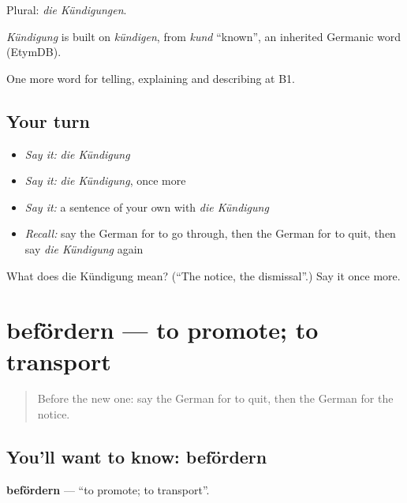 Plural: \emph{die Kündigungen}.

\begin{cousinweb}
\emph{Kündigung} is built on \emph{kündigen}, from \emph{kund} \textquotedblleft{}known\textquotedblright{}, an inherited Germanic word (EtymDB).
\end{cousinweb}

\begin{grammarlens}[title={What you've built}]
One more word for telling, explaining and describing at B1.
\end{grammarlens}

\subsection*{Your turn}
\begin{itemize}
\raggedright
  \item \emph{Say it:} \emph{die Kündigung}
  \item \emph{Say it:} \emph{die Kündigung}, once more
  \item \emph{Say it:} a sentence of your own with \emph{die Kündigung}
  \item \emph{Recall:} say the German for to go through, then the German for to quit, then say \emph{die Kündigung} again
\end{itemize}

\begin{tcolorbox}[breakable,colback=teal!4,colframe=teal!35!black,title={Before you move on}]
What does die Kündigung mean? (\textquotedblleft{}The notice, the dismissal\textquotedblright{}.) Say it once more.
\end{tcolorbox}
\section[befördern]{befördern — to promote; to transport}

\label{lesson:GE-C301-befoerdern}



\begin{quote}
Before the new one: say the German for to quit, then the German for the notice.
\end{quote}

\subsection*{You'll want to know: befördern}
\textbf{befördern} — \textquotedblleft{}to promote; to transport\textquotedblright{}.

